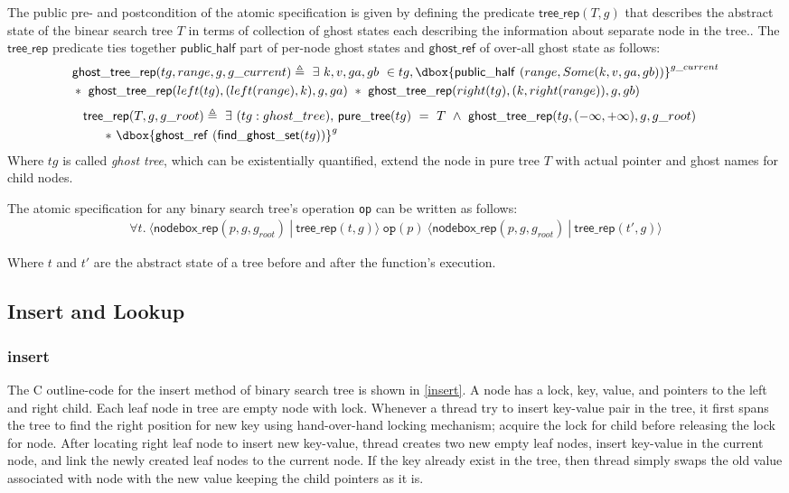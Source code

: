 \documentclass[acmsmall,screen]{acmart}\settopmatter{printfolios=true}
\newcommand\dboxed[1]{\dbox{\ensuremath{#1}}}
\newcommand{\ghost}[2]{\ensuremath{\dboxed{#1}^{#2}}}
\begin{document}
The public pre- and postcondition of the atomic specification is given by defining the predicate $\mathsf{tree\_rep}(T,g)$ that describes the abstract state of the binear search tree $T$  in terms of collection of ghost states each describing the information about separate node in the tree.. The $\mathsf{tree\_rep}$ predicate ties together $\mathsf{public\_half}$ part of per-node ghost states and $\mathsf{ghost\_ref}$ of over-all ghost state as follows: \begin{align*}&\mathsf{ghost\_tree\_rep}(tg,range, g, g\_current) \triangleq\ \exists\ k, v, ga, gb\ \in tg,\ghost{\mathsf{public\_half}\ (range, Some(k,v,ga,gb))}{g\_current}\\& *\ \mathsf{ghost\_tree\_rep}(left(tg),(left(range),k),g,ga)\ *\ \mathsf{ghost\_tree\_rep}(right(tg),(k, right(range)),g,gb) \end{align*}
\begin{align*}\mathsf{tree\_rep}(T,g,g\_root) \triangleq \ \exists\ (tg:ghost\_tree),\ &\mathsf{pure\_tree}(tg)\ =\ T\ \land\ \mathsf{ghost\_tree\_rep}(tg,(-\infty, +\infty),g,g\_root)&\\ *\ \ghost{\mathsf{ghost\_ref}\ (\mathsf{find\_ghost\_set}(tg))}{g}\end{align*}
Where $tg$ is called \emph{ghost tree}, which can be existentially quantified, extend the node in pure tree $T$ with actual pointer and ghost names for child nodes. 

The atomic specification for any binary search tree's operation \texttt{op} can be written as follows:
\begin{align*}\forall t.\ \langle \mathsf{nodebox\_rep}(p,g,g_{\mathit{root}})\ |\ \mathsf{tree\_rep}(t,g)\rangle\ \texttt{op}(p)\ \langle \mathsf{nodebox\_rep}(p,g,g_{\mathit{root}})\ |\ \mathsf{tree\_rep}(t', g)\rangle
\end{align*}

Where $t$ and $t'$ are the abstract state of a tree before and after the function's execution.

\subsection{Insert and Lookup}

\subsubsection{insert}
The C outline-code for the insert method of binary search tree is shown in \ref{insert}. A node has a lock, key, value, and pointers to the left and right child. Each leaf node in tree are empty node with lock. Whenever a thread try to insert key-value pair in the tree, it first spans the tree to find the right position for new key using hand-over-hand locking mechanism; acquire the lock for child before releasing the lock for node. After locating right leaf node to insert new key-value, thread creates two new empty leaf nodes, insert key-value in the current node, and link the newly created leaf nodes to the current node. If the key already exist in the tree, then thread simply swaps the old value associated with node with the new value keeping the child pointers as it is.
\end{document}
